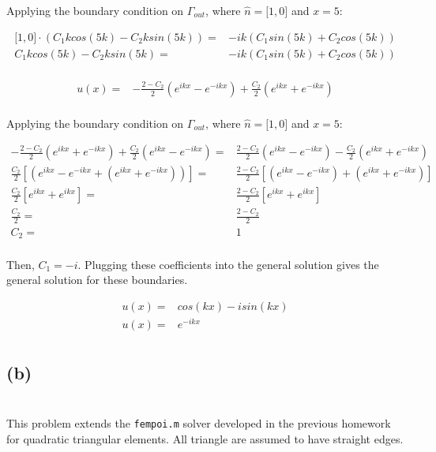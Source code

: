 \documentclass[10pt]{article}
\newcommand{\beqa}{\begin{equation}\begin{aligned}}
\newcommand{\eeqa}{\end{aligned}\end{equation}}
\begin{document}
Applying the boundary condition on \(\Gamma_{out}\), where \(\hat{n}=\lbrack 1, 0\rbrack\) and \(x=5\):

\beqa
\lbrack 1, 0\rbrack\cdot(C_1kcos(5k)-C_2ksin(5k))=&-ik(C_1sin(5k)+C_2cos(5k))\\
C_1kcos(5k)-C_2ksin(5k)=&-ik(C_1sin(5k)+C_2cos(5k))\\
\eeqa

\beqa
u(x)=&-\frac{2-C_2}{2}\left(e^{ikx}-e^{-ikx}\right)+\frac{C_2}{2}\left(e^{ikx}+e^{-ikx}\right)\\
\eeqa

Applying the boundary condition on \(\Gamma_{out}\), where \(\hat{n}=\lbrack 1, 0\rbrack\) and \(x=5\):

\beqa
-\frac{2-C_2}{2}\left(e^{ikx}+e^{-ikx}\right)+\frac{C_2}{2}\left(e^{ikx}-e^{-ikx}\right)=&\frac{2-C_2}{2}\left(e^{ikx}-e^{-ikx}\right)-\frac{C_2}{2}\left(e^{ikx}+e^{-ikx}\right)\\
\frac{C_2}{2}\left\lbrack\left(e^{ikx}-e^{-ikx}+\left(e^{ikx}+e^{-ikx}\right)\right)\right\rbrack=&\frac{2-C_2}{2}\left\lbrack\left(e^{ikx}-e^{-ikx}\right)+\left(e^{ikx}+e^{-ikx}\right)\right\rbrack\\
\frac{C_2}{2}\left\lbrack e^{ikx}+e^{ikx}\right\rbrack=&\frac{2-C_2}{2}\left\lbrack e^{ikx}+e^{ikx}\right\rbrack\\
\frac{C_2}{2}=&\frac{2-C_2}{2}\\
C_2=&1\\
\eeqa

Then, \(C_1=-i\). Plugging these coefficients into the general solution gives the general solution for these boundaries.

\beqa
u(x)=&cos(kx)-isin(kx)\\
u(x)=&e^{-ikx}\\
\eeqa

\subsection{(b)}

\section{}

\section{}

This problem extends the {\tt fempoi.m} solver developed in the previous homework for quadratic triangular elements. All triangle are assumed to have straight edges. 
\end{document}
